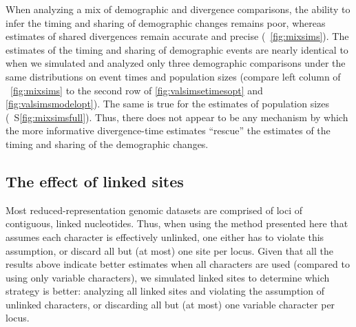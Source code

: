 When analyzing a mix of demographic and divergence comparisons, the ability to
infer the timing and sharing of demographic changes remains poor, whereas
estimates of shared divergences remain accurate and precise
(\fig{}~\ref{fig:mixsims}).
The estimates of the timing and sharing of demographic events are nearly
identical to when we simulated and analyzed only three demographic comparisons
under the same distributions on event times and population sizes
(compare left column of \fig{}~\ref{fig:mixsims}
to the second row of \figs
\ref{fig:valsimsetimesopt}
and
\ref{fig:valsimsmodelopt}).
The same is true for the estimates of population sizes
(\fig{}~S\ref{fig:mixsimsfull}).
Thus, there does not appear to be any mechanism by which the more informative
divergence-time estimates ``rescue'' the estimates of the timing and sharing of
the demographic changes.

\ifembed{

}{}


\subsection{The effect of linked sites}

Most reduced-representation genomic datasets are comprised of loci of
contiguous, linked nucleotides.
Thus, when using the method presented here that assumes each character is
effectively unlinked,
one either has to violate this assumption, or discard all but (at most) one
site per locus.
Given that all the results above indicate better estimates when all
characters are used (compared to using only variable characters), we
simulated linked sites to determine which strategy is better:
analyzing all linked sites and violating the assumption of unlinked characters,
or discarding all but (at most) one variable character per locus.

